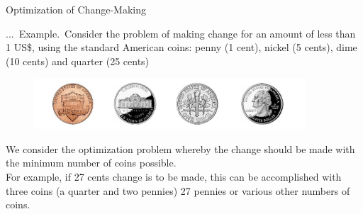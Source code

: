 \documentclass[smaller,hyperref={CJKbookmarks=true}]{beamer}
\newcounter{zhuo}[subsection]
\renewcommand{\thezhuo}{\thesection.\thesubsection.\arabic{zhuo}}
\newenvironment{EXAMPLE}{\stepcounter{zhuo}\alert{\!\thezhuo.~Example.\,}}{}
\begin{document}
\begin{frame}[c]{Optimization of Change-Making}
\begin{spacing}{1.1}
\begin{EXAMPLE}
Consider the problem of making change for an amount of
less than 1 US\$, using the standard American coins: penny (1 cent), nickel
(5 cents), dime (10 cents) and quarter (25 cents)
\begin{figure}
  \centering
  \includegraphics[width=0.9\textwidth]{coins.jpg}
\end{figure}
We consider the optimization problem whereby the change should be made
with the minimum number of coins possible.\\[5pt]
For example, if 27 cents change is to be made, this can be accomplished
with three coins (a quarter and two pennies) 27 pennies or various other
numbers of coins.
\end{EXAMPLE}
\end{spacing}
\end{frame}
\end{document}
